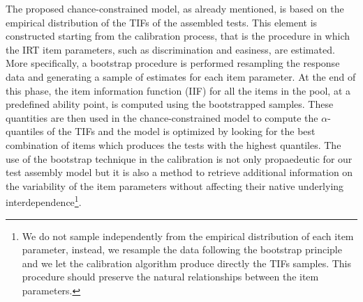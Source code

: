 The proposed chance-constrained model, as already mentioned, is based on the empirical distribution of the TIFs of the assembled tests. This element is constructed starting from the calibration process, that is the procedure in which the IRT item parameters, such as discrimination and easiness, are estimated. More specifically, a bootstrap procedure is performed resampling the response data and generating a sample of estimates for each item parameter. At the end of this phase, the item information function (IIF) for all the items in the pool, at a predefined ability point, is computed using the bootstrapped samples. These quantities are then used in the chance-constrained model to compute the $\alpha$-quantiles of the TIFs and the model is optimized by looking for the best combination of items which produces the tests with the highest quantiles. 
The use of the bootstrap technique in the calibration is not only propaedeutic for our test assembly model but it is also a method to retrieve additional information on the variability of the item parameters without affecting their native underlying interdependence\footnote{We do not sample independently from the empirical distribution of each item parameter, instead, we resample the data following the bootstrap principle and we let the calibration algorithm produce directly the TIFs samples. This procedure should preserve the natural relationships between the item parameters.}. 

